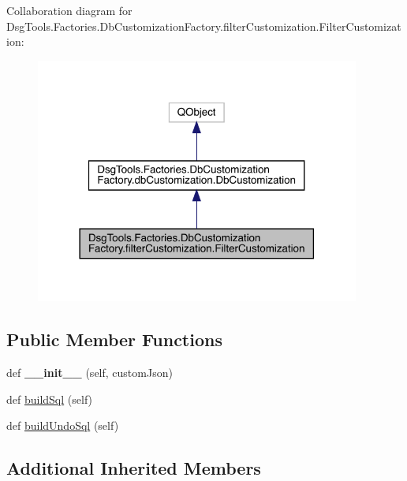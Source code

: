 Collaboration diagram for Dsg\+Tools.\+Factories.\+Db\+Customization\+Factory.\+filter\+Customization.\+Filter\+Customization\+:
\nopagebreak
\begin{figure}[H]
\begin{center}
\leavevmode
\includegraphics[width=302pt]{class_dsg_tools_1_1_factories_1_1_db_customization_factory_1_1filter_customization_1_1_filter_customization__coll__graph}
\end{center}
\end{figure}
\subsection*{Public Member Functions}
\begin{DoxyCompactItemize}
\item 
\mbox{\label{class_dsg_tools_1_1_factories_1_1_db_customization_factory_1_1filter_customization_1_1_filter_customization_a9983fa793cf0e5b46a63d2e7b384fd37}} 
def {\bfseries \+\_\+\+\_\+init\+\_\+\+\_\+} (self, custom\+Json)
\item 
def \mbox{\hyperlink{class_dsg_tools_1_1_factories_1_1_db_customization_factory_1_1filter_customization_1_1_filter_customization_a5f2c2feafaba6ba1b86dd4ddc83cdaef}{build\+Sql}} (self)
\item 
def \mbox{\hyperlink{class_dsg_tools_1_1_factories_1_1_db_customization_factory_1_1filter_customization_1_1_filter_customization_a94cb06feedb4307e34e22dc92c5e2f58}{build\+Undo\+Sql}} (self)
\end{DoxyCompactItemize}
\subsection*{Additional Inherited Members}


